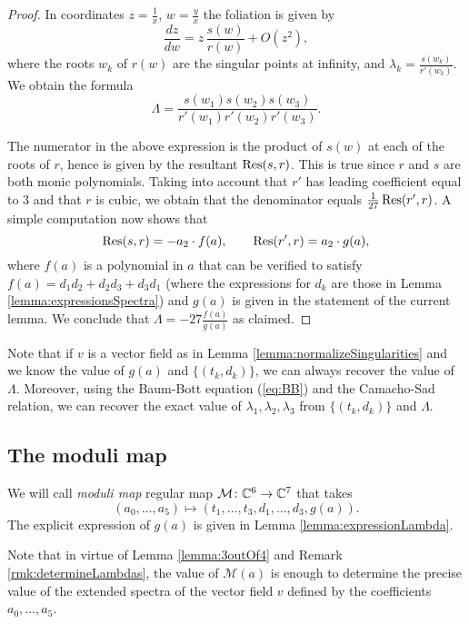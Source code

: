 \documentclass[phd,tocprelim]{cornell}
\begin{document}
\begin{proof}
 In coordinates $z=\displaystyle\frac{1}{x}$, $w=\displaystyle\frac{y}{x}$ the foliation is given by 
  \[ \frac{dz}{dw} = z\,\frac{s(w)}{r(w)} + O(z^2), \]
 where the roots $w_k$ of $r(w)$ are the singular points at infinity, and  $\lambda_k=\displaystyle\frac{s(w_k)}{r'(w_k)}$. We obtain the formula
  \[ \Lambda = \frac{s(w_1)s(w_2)s(w_3)}{r'(w_1)r'(w_2)r'(w_3)}. \]
  
 The numerator in the above expression is the product of $s(w)$ at each of the roots of $r$, hence is given by the resultant $\operatorname{Res}(s,r)$.  This is true since $r$ and $s$ are both monic polynomials. Taking into account that $r'$ has leading coefficient equal to $3$ and that $r$ is cubic, we obtain that the denominator equals $\frac{1}{27}\operatorname{Res}(r',r)$. A simple computation now shows that 
  \[ \operatorname{Res}(s,r)=-a_2\cdot f(a), \qquad \operatorname{Res}(r',r)=a_2\cdot g(a), \]
 where $f(a)$ is a polynomial in $a$ that can be verified to satisfy $f(a)=d_1d_2+d_2d_3+d_3d_1$ (where the expressions for $d_k$ are those in Lemma \ref{lemma:expressionsSpectra}) and $g(a)$ is given in the statement of the current lemma. We conclude that $\Lambda=-27\frac{f(a)}{g(a)}$ as claimed.
\end{proof}

\begin{remark}\label{rmk:determineLambdas}
 Note that if $v$ is a vector field as in Lemma \ref{lemma:normalizeSingularities} and we know the value of $g(a)$ and $\{(t_k,d_k)\}$, we can always recover the value of $\Lambda$. Moreover, using the Baum-Bott equation (\ref{eq:BB}) and the Camacho-Sad relation, we can recover the exact value of $\lambda_1,\lambda_2,\lambda_3$ from $\{(t_k,d_k)\}$ and $\Lambda$.
\end{remark}


\subsection{The moduli map} 

\begin{definition}\label{def:moduliMap}
We will call \textit{moduli map} regular map $\mathcal{M}\colon\mathbb{C}^6\to\mathbb{C}^7$ that takes 
\[ (a_0,\ldots,a_5)\longmapsto (t_1,\ldots,t_3,d_1,\ldots,d_3,g(a)).  \]
The explicit expression of $g(a)$ is given in Lemma \ref{lemma:expressionLambda}.
\end{definition}

Note that in virtue of Lemma \ref{lemma:3outOf4} and Remark \ref{rmk:determineLambdas}, the value of $\mathcal{M}(a)$ is enough to determine the precise value of the extended spectra of the vector field $v$ defined by the coefficients $a_0,\ldots,a_5$.
\end{document}
